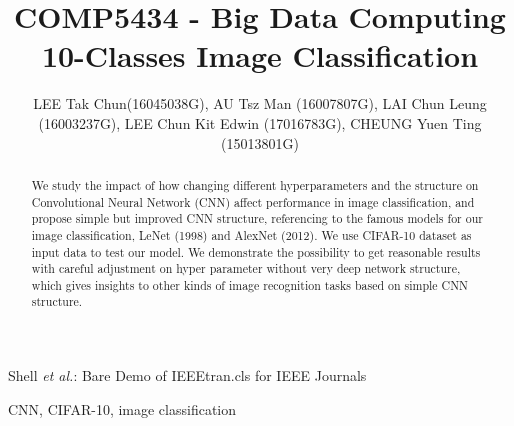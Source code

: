 \documentclass[journal,onecolumn]{IEEEtran}
\begin{document}
\title{COMP5434 - Big Data Computing \\
10-Classes Image Classification}

%


\author{ LEE Tak Chun(16045038G), AU Tsz Man (16007807G), 
LAI Chun Leung (16003237G), LEE Chun Kit Edwin (17016783G), 
CHEUNG Yuen Ting (15013801G)
}


%
{Shell \MakeLowercase{\textit{et al.}}: Bare Demo of IEEEtran.cls for IEEE Journals}
%

\maketitle

\begin{abstract}
  We study the impact of how changing different hyperparameters and the structure on Convolutional Neural Network (CNN) affect performance in image classification, and propose simple but improved CNN structure, referencing to the famous models for our image classification, LeNet (1998) and AlexNet (2012). We use CIFAR-10 dataset as input data to test our model. We demonstrate the possibility to get reasonable results with careful adjustment on hyper parameter without very deep network structure, which gives insights to other kinds of image recognition tasks based on simple CNN structure.

\end{abstract}

\begin{IEEEkeywords}
CNN, CIFAR-10, image classification
\end{IEEEkeywords}






%
\IEEEpeerreviewmaketitle
\end{document}
